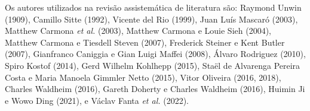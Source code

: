 \documentclass[12pt, a4paper]{book} %
\begin{document}
        Os autores utilizados na revisão assistemática de literatura são: Raymond Unwin (1909), Camillo Sitte (1992), Vicente del Rio (1999), Juan Luís Mascaró (2003), Matthew Carmona \textit{et al.} (2003), Matthew Carmona e Louie Sieh (2004), Matthew Carmona e Tiesdell Steven (2007), Frederick Steiner e Kent Butler (2007), Gianfranco Caniggia e Gian Luigi Maffei (2008), Álvaro Rodriguez (2010), Spiro Kostof (2014), Gerd Wilhelm Kohlhepp (2015), Staël de Alvarenga Pereira Costa e Maria Manoela Gimmler Netto (2015), Vitor Oliveira (2016, 2018), Charles Waldheim (2016), Gareth Doherty e Charles Waldheim (2016), Huimin Ji e Wowo Ding (2021), e Václav Fanta \textit{et al.} (2022).

                
\end{document}
